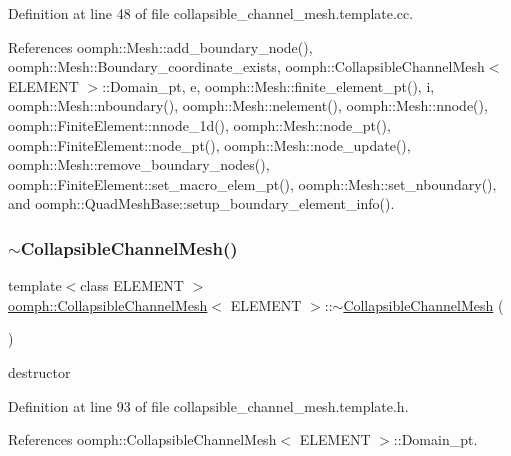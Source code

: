 Definition at line 48 of file collapsible\+\_\+channel\+\_\+mesh.\+template.\+cc.



References oomph\+::\+Mesh\+::add\+\_\+boundary\+\_\+node(), oomph\+::\+Mesh\+::\+Boundary\+\_\+coordinate\+\_\+exists, oomph\+::\+Collapsible\+Channel\+Mesh$<$ E\+L\+E\+M\+E\+N\+T $>$\+::\+Domain\+\_\+pt, e, oomph\+::\+Mesh\+::finite\+\_\+element\+\_\+pt(), i, oomph\+::\+Mesh\+::nboundary(), oomph\+::\+Mesh\+::nelement(), oomph\+::\+Mesh\+::nnode(), oomph\+::\+Finite\+Element\+::nnode\+\_\+1d(), oomph\+::\+Mesh\+::node\+\_\+pt(), oomph\+::\+Finite\+Element\+::node\+\_\+pt(), oomph\+::\+Mesh\+::node\+\_\+update(), oomph\+::\+Mesh\+::remove\+\_\+boundary\+\_\+nodes(), oomph\+::\+Finite\+Element\+::set\+\_\+macro\+\_\+elem\+\_\+pt(), oomph\+::\+Mesh\+::set\+\_\+nboundary(), and oomph\+::\+Quad\+Mesh\+Base\+::setup\+\_\+boundary\+\_\+element\+\_\+info().

\mbox{\label{classoomph_1_1CollapsibleChannelMesh_a1c9b2ab27f1fb2f764ae2dc6f9f7a429}} 
\subsubsection{\texorpdfstring{$\sim$\+Collapsible\+Channel\+Mesh()}{~CollapsibleChannelMesh()}}
{\footnotesize\ttfamily template$<$class E\+L\+E\+M\+E\+NT $>$ \\
\hyperlink{classoomph_1_1CollapsibleChannelMesh}{oomph\+::\+Collapsible\+Channel\+Mesh}$<$ E\+L\+E\+M\+E\+NT $>$\+::$\sim$\hyperlink{classoomph_1_1CollapsibleChannelMesh}{Collapsible\+Channel\+Mesh} (\begin{DoxyParamCaption}{ }\end{DoxyParamCaption})\hspace{0.3cm}{\ttfamily [inline]}}



destructor 



Definition at line 93 of file collapsible\+\_\+channel\+\_\+mesh.\+template.\+h.



References oomph\+::\+Collapsible\+Channel\+Mesh$<$ E\+L\+E\+M\+E\+N\+T $>$\+::\+Domain\+\_\+pt.



